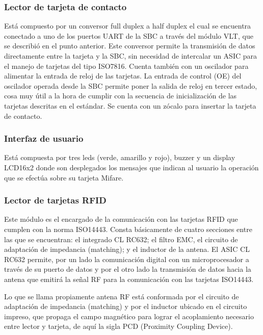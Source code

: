 \documentclass[%
        final,
        notitlepage,
        narroweqnarray,
        inline,
        ]{ieee}
\begin{document}
\subsubsection{Lector de tarjeta de contacto}

Está compuesto por un conversor full duplex a half duplex el cual se encuentra conectado a uno de los puertos UART de la SBC a través del módulo VLT, que se describió en el punto anterior. Este conversor permite la transmisión de datos directamente entre la tarjeta y la SBC, sin necesidad de intercalar un ASIC para el manejo de tarjetas del tipo ISO7816. Cuenta también con un oscilador para alimentar la entrada de reloj de las tarjetas. La entrada de control (OE) del oscilador operada desde la SBC permite poner la salida de reloj en tercer estado, cosa muy útil a la hora de cumplir con la secuencia de inicialización de las tarjetas descritas en el estándar. Se cuenta con un zócalo para insertar la tarjeta de contacto.


\subsubsection{Interfaz de usuario}

Está compuesta por tres leds (verde, amarillo y rojo), buzzer y un display LCD16x2 donde son desplegados los mensajes que indican al usuario la operación que se efectúa sobre su tarjeta Mifare.


\subsubsection{Lector de tarjetas RFID}

Este módulo es el encargado de la comunicación con las tarjetas RFID que cumplen con la norma ISO14443. Consta básicamente de cuatro secciones entre las que se encuentran: el integrado CL RC632; el filtro EMC, el circuito de adaptación de impedancia (matching); y el inductor de la antena. 
El ASIC CL RC632 permite, por un lado la comunicación digital con un microprocesador a través de su puerto de datos y por el otro lado la transmisión de datos hacia la antena que emitirá la señal RF para la comunicación con las tarjetas ISO14443.

Lo que se llama propiamente antena RF está conformada por el circuito de adaptación de impedancia (matching) y por el inductor ubicado en el circuito impreso, que propaga el campo magnético para lograr el acoplamiento necesario entre lector y tarjeta, de aquí la sigla PCD (Proximity Coupling Device).
\end{document}
